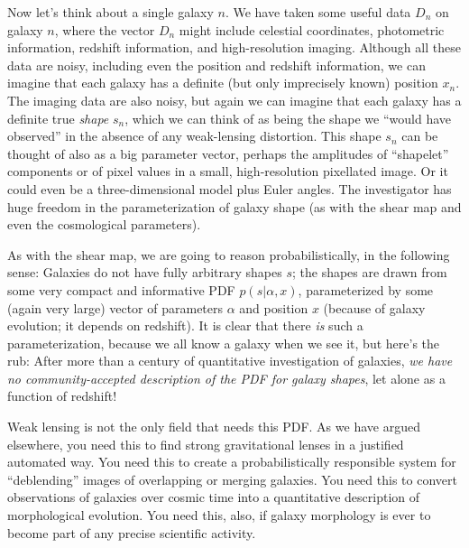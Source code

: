\documentclass[12pt, pdftex]{article}
\newcommand{\position}{x}
\newcommand{\data}{D}
\newcommand{\shape}{s}
\newcommand{\shapepars}{\alpha}
\begin{document}
Now let's think about a single galaxy $n$.  We have taken some useful
data $\data_n$ on galaxy $n$, where the vector $\data_n$ might include
celestial coordinates, photometric information, redshift information,
and high-resolution imaging.  Although all these data are noisy,
including even the position and redshift information, we can imagine
that each galaxy has a definite (but only imprecisely known) position
$\position_n$.  The imaging data are also noisy, but again we can
imagine that each galaxy has a definite true \emph{shape} $\shape_n$,
which we can think of as being the shape we ``would have observed'' in
the absence of any weak-lensing distortion.  This shape $\shape_n$ can
be thought of also as a big parameter vector, perhaps the amplitudes
of ``shapelet'' components or of pixel values in a small,
high-resolution pixellated image.  Or it could even be a
three-dimensional model plus Euler angles.  The investigator has huge
freedom in the parameterization of galaxy shape (as with the shear map
and even the cosmological parameters).

As with the shear map, we are going to reason probabilistically, in
the following sense: Galaxies do not have fully arbitrary shapes
$\shape$; the shapes are drawn from some very compact and informative
PDF $p(\shape|\shapepars,\position)$, parameterized by some (again
very large) vector of parameters $\shapepars$ and position $\position$
(because of galaxy evolution; it depends on redshift).  It is clear
that there \emph{is} such a parameterization, because we all know a
galaxy when we see it, but here's the rub: After more than a century
of quantitative investigation of galaxies, \emph{we have no
  community-accepted description of the PDF for galaxy shapes}, let
alone as a function of redshift!

Weak lensing is not the only field that needs this PDF.  As we have
argued elsewhere, you need this to find strong gravitational lenses in
a justified automated way.  You need this to create a
probabilistically responsible system for ``deblending'' images of
overlapping or merging galaxies.  You need this to convert
observations of galaxies over cosmic time into a quantitative
description of morphological evolution.  You need this, also, if
galaxy morphology is ever to become part of any precise scientific
activity.
\end{document}

